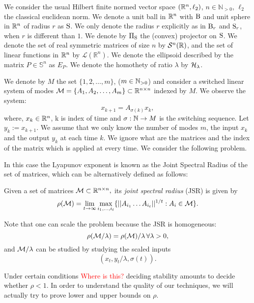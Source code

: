 We consider the usual Hilbert finite normed vector space $(\mathbb{R}^n,\ell_2)$, $n \in \mathbb{N}_{> 0}$, $\ell_2$ the classical euclidean norm. We denote a unit ball in $\mathbb{R}^n$ with $\text{B}$ and unit sphere in $\mathbb{R}^n$ of radius $r$ as $\text{S}$. We only denote the radius $r$ explicitly as in $\text{B}_r$ and $\text{S}_r$, when $r$ is different than $1$. We denote by $\Pi_{\text{S}}$ the (convex) projector on $\text{S}$. We denote the set of real symmetric matrices of size $n$ by $\mathcal{S}^n(\mathbb{R})$, and the set of linear functions in $\mathbb{R}^n$ by $\mathcal{L}(\mathbb{R}^n)$. We denote the ellipsoid described by the matrix $P \in \mathbb{S}^n$ as $E_P$. We denote the homothety of ratio $\lambda$ by $\mathcal{H}_{\lambda}$.

We denote by $M$ the set $\{1,2,\dots,m\}$, ($m \in \mathbb{N}_{>0}$) and consider a switched linear system of modes $\mathcal{M} = \{A_1, A_2,\dots, A_m\} \subset \mathbb{R}^{n \times n}$ indexed by $M$. We observe the system: 
\begin{equation}\label{eq:dynamicalsystem}x_{k+1} = A_{\sigma(k)}x_k,
\end{equation}
where, $x_k \in \mathbb{R}^n$, k is index of time and $\sigma: \mathbb{N} \to M$ is the switching sequence. Let $y_k := x_{k+1}$. 
We assume that we only know the number of modes $m$, the input $x_k$ and the output $y_k$ at each time $k$. We ignore what are the matrices and the index of the matrix which is applied at every time. We consider the following problem.

In this case the Lyapunov exponent is known as the Joint Spectral Radius of the set of matrices, which can be alternatively defined as follows:
\begin{definition}  \cite{jungers_lncis} Given a set of matrices $\mathcal{M} \subset \mathbb{R}^{n\times n},$ its \emph{joint spectral radius} (JSR) is given by
$$\rho(\mathcal{M}) =\lim_{t\rightarrow \infty} \max_{i_1,\dots, i_t}\{||A_{i_1} \dots A_{i_t}||^{1/t}: A_i\in\mathcal{M}\}. $$
\end{definition}

\begin{remark}
 Note that one can scale the problem because the JSR is homogeneous:
$$\rho(\mathcal{M}/\lambda)=\rho(\mathcal{M})/\lambda\, \forall \lambda>0, $$ and $\mathcal{M}/\lambda$ can be studied by studying the scaled inputs $$(x_t, y_t/\lambda,\sigma(t)).$$
\end{remark}

Under certain conditions \textcolor{red}{Where is this?} deciding stability amounts to decide whether $\rho<1.$  In order to understand the quality of our techniques, we will actually try to prove lower and upper bounds on $\rho.$ 
